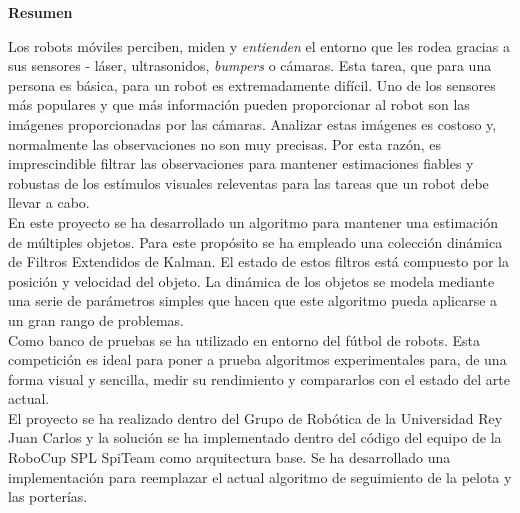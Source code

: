 \vspace{5 cm}
\textbf{\Huge{Resumen}}
\vspace{1.5 cm}

Los robots móviles perciben, miden y \textit{entienden} el entorno que les rodea gracias a sus sensores - láser, ultrasonidos, \textit{bumpers} o cámaras. Esta tarea, que para una persona es básica, para un robot es extremadamente difícil. Uno de los sensores más populares y que más información pueden proporcionar al robot son las imágenes proporcionadas por las cámaras. Analizar estas imágenes es costoso y, normalmente las observaciones no son muy precisas. Por esta razón, es imprescindible filtrar las observaciones para mantener estimaciones fiables y robustas de los estímulos visuales releventas para las tareas que un robot debe llevar a cabo. \\

En este proyecto se ha desarrollado un algoritmo para mantener una estimación de múltiples objetos. Para este propósito se ha empleado una colección dinámica de Filtros Extendidos de Kalman. El estado de estos filtros está compuesto por la posición y velocidad del objeto. La dinámica de los objetos se modela mediante una serie de parámetros simples que hacen que este algoritmo pueda aplicarse a un gran rango de problemas. \\

Como banco de pruebas se ha utilizado en entorno del fútbol de robots. Esta competición es ideal para poner a prueba algoritmos experimentales para, de una forma visual y sencilla, medir su rendimiento y compararlos con el estado del arte actual. \\

El proyecto se ha realizado dentro del Grupo de Robótica de la Universidad Rey Juan Carlos y la solución se ha implementado dentro del código del equipo de la RoboCup SPL SpiTeam como arquitectura base. Se ha desarrollado una implementación para reemplazar el actual algoritmo de seguimiento de la pelota y las porterías.
